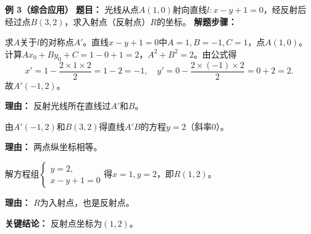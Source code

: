 \begin{examplebox}
	\medskip
	\textbf{\textcolor{CExample}{例 3（综合应用）}}
	\textbf{\textcolor{CExample}{题目：}}
	光线从点$A(1,0)$射向直线$l:x-y+1=0$，经反射后经过点$B(3,2)$，求入射点（反射点）$R$的坐标。
	\textbf{\textcolor{CExample}{解题步骤：}}
	\begin{description}[style=nextline, leftmargin=2.8em, labelsep=0.5em, itemsep=0.45em]
		\item[\textbf{第一步（求对称点）：}]
			求$A$关于$l$的对称点$A'$。直线$x-y+1=0$中$A=1,B=-1,C=1$，点$A(1,0)$。计算$Ax_0+By_0+C=1-0+1=2$，$A^2+B^2=2$。由公式得
			\[
				x'=1-\dfrac{2\times1\times2}{2}=1-2=-1,\quad y'=0-\dfrac{2\times(-1)\times2}{2}=0+2=2.
			\]
			故$A'(-1,2)$。
			\par\textbf{理由：} 反射光线所在直线过$A'$和$B$。
		\item[\textbf{第二步（求反射线方程）：}]
			由$A'(-1,2)$和$B(3,2)$得直线$A'B$的方程$y=2$（斜率$0$）。
			\par\textbf{理由：} 两点纵坐标相等。
		\item[\textbf{第三步（求交点）：}]
			解方程组$
			\begin{cases}
				y=2,\\x-y+1=0
		\end{cases}
			$得$x=1,y=2$，即$R(1,2)$。
			\par\textbf{理由：} $R$为入射点，也是反射点。
	\end{description}
	\textbf{\textcolor{CExample}{关键结论：}}
	反射点坐标为$(1,2)$。
\end{examplebox}

